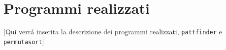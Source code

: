 \chapter{Programmi realizzati}
[Qui verr\'a inserita la descrizione dei programmi realizzati, \texttt{pattfinder} e \texttt{permutasort}]